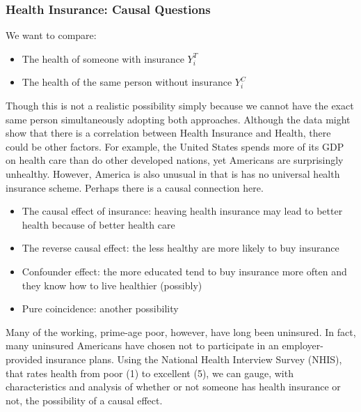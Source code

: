 \documentclass[12pt, letterpaper]{article}
\begin{document}
{\subsubsection{Health Insurance: Causal Questions}
We want to compare:
\begin{itemize}
	\item The health of someone with insurance $Y_i^T$
	\item The health of the same person without insurance $Y_i^C$
\end{itemize}
Though this is not a realistic possibility simply because we cannot have the exact same person simultaneously adopting both approaches. Although the data might show that there is a correlation between Health Insurance and Health, there could be other factors. For example, the United States spends more of its GDP on health care than do other developed nations, yet Americans are surprisingly unhealthy. However, America is also unusual in that is has no universal health insurance scheme. Perhaps there is a causal connection here.
\begin{itemize}
	\item The causal effect of insurance: heaving health insurance may lead to better health because of better health care
	\item The reverse causal effect: the less healthy are more likely to buy insurance
	\item Confounder effect: the more educated tend to buy insurance more often and they know how to live healthier (possibly)
	\item Pure coincidence: another possibility
\end{itemize}
Many of the working, prime-age poor, however, have long been uninsured. In fact, many uninsured Americans have chosen not to participate in an employer-provided insurance plans. Using the National Health Interview Survey (NHIS), that rates health from poor (1) to excellent (5), we can gauge, with characteristics and analysis of whether or not someone has health insurance or not, the possibility of a causal effect.

}
\end{document}
